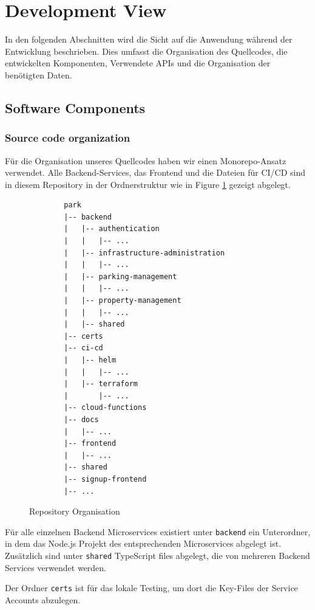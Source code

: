 \section{Development View}

In den folgenden Abschnitten wird die Sicht auf die Anwendung während der Entwicklung beschrieben. Dies umfasst die Organisation des Quellcodes, die entwickelten Komponenten, Verwendete APIs und die Organisation der benötigten Daten.

\subsection{Software Components}

\subsubsection{Source code organization}
Für die Organisation unseres Quellcodes haben wir einen Monorepo-Ansatz verwendet. Alle Backend-Services, das Frontend und die Dateien für CI/CD sind in diesem Repository in der Ordnerstruktur wie in Figure \ref{fig:repo-structure} gezeigt abgelegt.

\begin{figure}[ht]
    \begin{verbatim}
        park
        |-- backend
        |   |-- authentication
        |   |   |-- ...
        |   |-- infrastructure-administration
        |   |   |-- ...
        |   |-- parking-management
        |   |   |-- ...
        |   |-- property-management
        |   |   |-- ...
        |   |-- shared
        |-- certs
        |-- ci-cd
        |   |-- helm
        |   |   |-- ...
        |   |-- terraform
        |       |-- ...
        |-- cloud-functions
        |-- docs
        |   |-- ...
        |-- frontend
        |   |-- ...
        |-- shared
        |-- signup-frontend
        |-- ...
    \end{verbatim}
    \caption{Repository Organisation}
    \label{fig:repo-structure}
\end{figure}

Für alle einzelnen Backend Microservices existiert unter \verb|backend| ein Unterordner, in dem das Node.js Projekt des entsprechenden Microservices abgelegt ist. Zusätzlich sind unter \verb|shared| TypeScript files abgelegt, die von mehreren Backend Services verwendet werden.

Der Ordner \verb|certs| ist für das lokale Testing, um dort die Key-Files der Service Accounts abzulegen.

